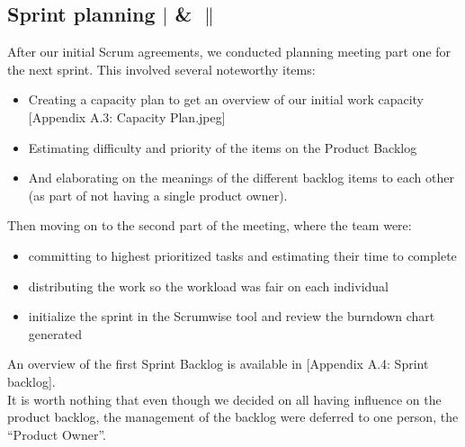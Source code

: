 \subsection{Sprint planning $|$ \& $\|$}
After our initial Scrum agreements, we conducted planning meeting part one for the next sprint. This involved several noteworthy items:
\begin{itemize}
\item Creating a capacity plan to get an overview of our initial work capacity [Appendix A.3: Capacity Plan.jpeg]
\item Estimating difficulty and priority of the items on the Product Backlog
\item And elaborating on the meanings of the different backlog items to each other (as part of not having a single product owner).
\end{itemize}
Then moving on to the second part of the meeting, where the team were:
\begin{itemize}
\item committing to highest prioritized tasks and estimating their time to complete
\item distributing the work so the workload was fair on each individual
\item initialize the sprint in the Scrumwise tool and review the burndown chart generated
\end{itemize}
An overview of the first Sprint Backlog is available in [Appendix A.4: Sprint backlog].\\
It is worth nothing that even though we decided on all having influence on the product backlog, the management of the backlog were deferred to one person, the “Product Owner”.\\




\newpage